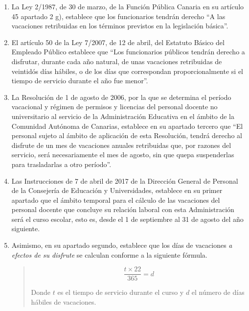 \begin{enumerate}

\item La Ley 2/1987, de 30 de marzo, de la Función Pública Canaria en su 
artículo 45 apartado 2 g), establece que los funcionarios tendrán derecho 
\enquote{A las vacaciones retribuidas en los términos previstos en la 
legislación básica}.

\item El artículo 50 de la Ley 7/2007, de 12 de abril, del Estatuto Básico del 
Empleado Público establece que \enquote{Los funcionarios públicos tendrán 
derecho a disfrutar, durante cada año natural, de unas vacaciones retribuidas de
 veintidós días hábiles, o de los días que correspondan proporcionalmente si el 
 tiempo de servicio durante el año fue menor}.

\item La Resolución de 1 de agosto de 2006, por la que se determina el período 
vacacional y régimen de permisos y licencias del personal docente no 
universitario al servicio de la Administración Educativa en el ámbito de la 
Comunidad Autónoma de Canarias, establece en su apartado tercero que 
\enquote{El personal sujeto al ámbito de aplicación de esta Resolución, tendrá 
derecho al disfrute de un mes de vacaciones anuales retribuidas que, por razones 
del servicio, será necesariamente el mes de agosto, sin que quepa suspenderlas 
para trasladarlas a otro período}.

\item Las Instrucciones de 7 de abril de 2017 de la Dirección General de 
Personal de la Consejería de Educación y Universidades, establece en su primer 
apartado que el ámbito temporal para el cálculo de las vacaciones del personal 
docente que concluye su relación laboral con esta Administración será el curso 
escolar, esto es, desde el 1 de septiembre al 31 de agosto del año siguiente.

\item Asimismo, en su apartado segundo,  establece que 
los días de vacaciones \emph{a efectos de su disfrute} se calculan conforme a la
siguiente fórmula. 

\begin{quotation}

\begin{equation*}
  \frac{t \times 22 }{365} = {d}
\end{equation*}

\espacio

\noindent Donde $t$ es el tiempo de servicio durante el curso y $d$ el número de
 días hábiles de vacaciones.


\end{quotation}
\end{enumerate}
